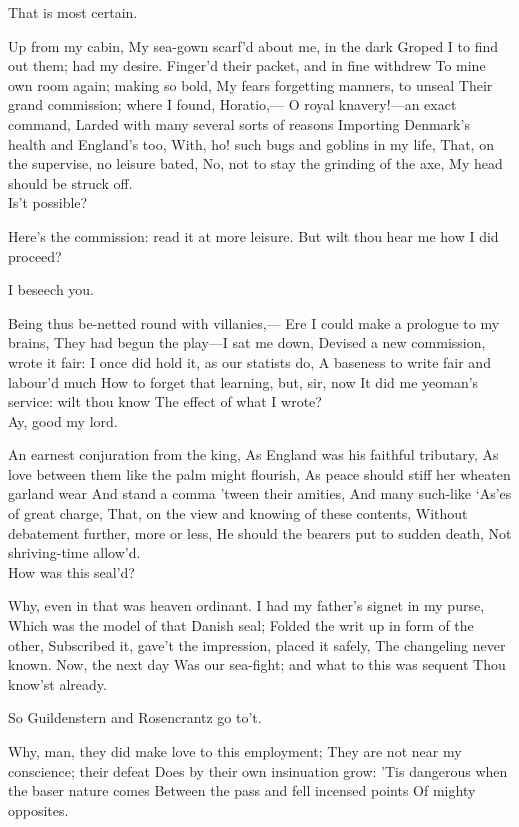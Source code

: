 \documentclass[11pt]{book}
\begin{document}
\6	That is most certain.

\1	Up from my cabin,
	My sea-gown scarf'd about me, in the dark
	Groped I to find out them; had my desire.
	Finger'd their packet, and in fine withdrew
	To mine own room again; making so bold,
	My fears forgetting manners, to unseal
	Their grand commission; where I found, Horatio,---
	O royal knavery!---an exact command,
	Larded with many several sorts of reasons
	Importing Denmark's health and England's too,
	With, ho! such bugs and goblins in my life,
	That, on the supervise, no leisure bated,
	No, not to stay the grinding of the axe,
	My head should be struck off. \\

\6	Is't possible?

\1	Here's the commission: read it at more leisure.
	But wilt thou hear me how I did proceed?

\6	I beseech you.

\1	Being thus be-netted round with villanies,---
	Ere I could make a prologue to my brains,
	They had begun the play---I sat me down,
	Devised a new commission, wrote it fair:
	I once did hold it, as our statists do,
	A baseness to write fair and labour'd much
	How to forget that learning, but, sir, now
	It did me yeoman's service: wilt thou know
	The effect of what I wrote? \\

\6	Ay, good my lord.

\1	An earnest conjuration from the king,
	As England was his faithful tributary,
	As love between them like the palm might flourish,
	As peace should stiff her wheaten garland wear
	And stand a comma 'tween their amities,
	And many such-like `As'es of great charge,
	That, on the view and knowing of these contents,
	Without debatement further, more or less,
	He should the bearers put to sudden death,
	Not shriving-time allow'd. \\

\6	How was this seal'd?

\1	Why, even in that was heaven ordinant.
	I had my father's signet in my purse,
	Which was the model of that Danish seal;
	Folded the writ up in form of the other,
	Subscribed it, gave't the impression, placed it safely,
	The changeling never known. Now, the next day
	Was our sea-fight; and what to this was sequent
	Thou know'st already.

\6	So Guildenstern and Rosencrantz go to't.

\1	Why, man, they did make love to this employment;
	They are not near my conscience; their defeat
	Does by their own insinuation grow:
	'Tis dangerous when the baser nature comes
	Between the pass and fell incensed points
	Of mighty opposites. \\
\end{document}
